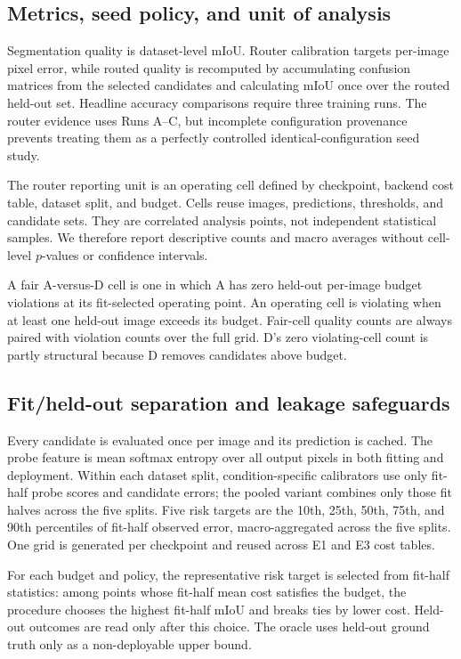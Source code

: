 \documentclass[a4paper,review,12pt]{elsarticle}
\newcommand{\miou}{mIoU}
\begin{document}
\subsection{Metrics, seed policy, and unit of analysis}

Segmentation quality is dataset-level \miou{}. Router calibration targets per-image pixel error, while routed quality is recomputed by accumulating confusion matrices from the selected candidates and calculating \miou{} once over the routed held-out set. Headline accuracy comparisons require three training runs. The router evidence uses Runs A--C, but incomplete configuration provenance prevents treating them as a perfectly controlled identical-configuration seed study.

The router reporting unit is an operating cell defined by checkpoint, backend cost table, dataset split, and budget. Cells reuse images, predictions, thresholds, and candidate sets. They are correlated analysis points, not independent statistical samples. We therefore report descriptive counts and macro averages without cell-level $p$-values or confidence intervals.

A fair A-versus-D cell is one in which A has zero held-out per-image budget violations at its fit-selected operating point. An operating cell is violating when at least one held-out image exceeds its budget. Fair-cell quality counts are always paired with violation counts over the full grid. D's zero violating-cell count is partly structural because D removes candidates above budget.

\subsection{Fit/held-out separation and leakage safeguards}
\label{sec:split}

Every candidate is evaluated once per image and its prediction is cached. The probe feature is mean softmax entropy over all output pixels in both fitting and deployment. Within each dataset split, condition-specific calibrators use only fit-half probe scores and candidate errors; the pooled variant combines only those fit halves across the five splits. Five risk targets are the 10th, 25th, 50th, 75th, and 90th percentiles of fit-half observed error, macro-aggregated across the five splits. One grid is generated per checkpoint and reused across E1 and E3 cost tables.

For each budget and policy, the representative risk target is selected from fit-half statistics: among points whose fit-half mean cost satisfies the budget, the procedure chooses the highest fit-half \miou{} and breaks ties by lower cost. Held-out outcomes are read only after this choice. The oracle uses held-out ground truth only as a non-deployable upper bound.
\end{document}

